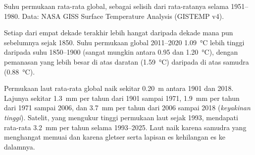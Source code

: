 \begin{omfigure}

{\small Suhu permukaan rata-rata global, sebagai selisih dari rata-ratanya
selama 1951--1980. Data: NASA GISS Surface Temperature Analysis (GISTEMP v4).}
\end{omfigure}

\begin{proposition}\label{prop:g12:climate-change:warming}
Setiap dari empat dekade terakhir lebih hangat daripada dekade mana pun
sebelumnya sejak 1850. Suhu permukaan global 2011--2020 \qty{1.09}{\degreeCelsius}
lebih tinggi daripada suhu 1850--1900 (sangat mungkin antara 0.95 dan
\qty{1.20}{\degreeCelsius}), dengan pemanasan yang lebih besar di atas daratan
(\qty{1.59}{\degreeCelsius}) daripada di atas samudra (\qty{0.88}{\degreeCelsius}).
\end{proposition}

\begin{proposition}\label{prop:g12:climate-change:sea}
Permukaan laut rata-rata global naik sekitar \qty{0.20}{m} antara 1901 dan
2018. Lajunya sekitar \qty{1.3}{mm} per tahun dari 1901 sampai 1971,
\qty{1.9}{mm} per tahun dari 1971 sampai 2006, dan \qty{3.7}{mm} per tahun dari
2006 sampai 2018 (\emph{keyakinan tinggi}). Satelit, yang mengukur tinggi
permukaan laut sejak 1993, mendapati rata-rata \qty{3.2}{mm} per tahun selama
1993--2025. Laut naik karena samudra yang menghangat memuai dan karena gletser
serta lapisan es kehilangan es ke dalamnya.
\end{proposition}

